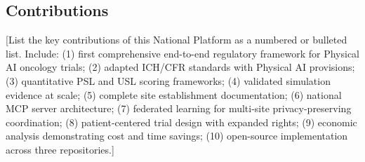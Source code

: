 \subsection{Contributions}
\label{subsec:contributions}

[List the key contributions of this National Platform as a numbered or bulleted
list. Include: (1) first comprehensive end-to-end regulatory framework for
Physical AI oncology trials; (2) adapted ICH/CFR standards with Physical AI
provisions; (3) quantitative PSL and USL scoring frameworks; (4) validated
simulation evidence at scale; (5) complete site establishment documentation;
(6) national MCP server architecture; (7) federated learning for multi-site
privacy-preserving coordination; (8) patient-centered trial design with
expanded rights; (9) economic analysis demonstrating cost and time savings;
(10) open-source implementation across three repositories.]
